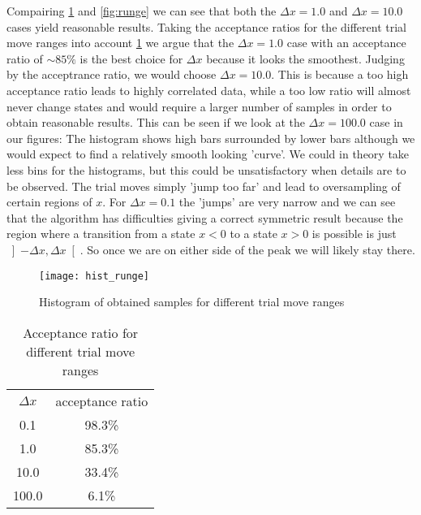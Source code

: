 \documentclass[a4paper,11pt,bibtotoc]{scrartcl}
\begin{document}
Compairing \cref{fig:hist_runge} and \cref{fig:runge} we can see that both
the $\Delta x = 1.0$ and $\Delta x = 10.0$ cases yield reasonable results.
Taking the acceptance ratios for the different trial move ranges into account
\cref{tab:acceptance} we argue that the $\Delta x = 1.0$ case with an acceptance
ratio of $\sim 85\%$ is the best choice for $\Delta x$ because it looks the smoothest.
Judging by the acceptrance ratio, we would choose $\Delta x = 10.0$.
This is because a too high acceptance ratio leads to highly correlated data,
while a too low ratio will almost never change states and would require
a larger number of samples in order to obtain reasonable results.
This can be seen if we look at the $\Delta x = 100.0$ case in our figures:
The histogram shows high bars surrounded by lower bars although we would expect
to find a relatively smooth looking 'curve'.
We could in theory take less bins for the histograms, but this could be unsatisfactory
when details are to be observed. The trial moves simply 'jump too far'
and lead to oversampling of certain regions of $x$.
For $\Delta x = 0.1$ the 'jumps' are very narrow and we can see that the algorithm
has difficulties giving a correct symmetric result because the region where a transition
from a state $x<0$ to a state $x>0$ is possible is just $\left]-\Delta x, \Delta x \right[$.
So once we are on either side of the peak we will likely stay there.

\begin{figure}[htb]
  \centering
  \texttt{[image: hist\_runge]}
  \caption{Histogram of obtained samples for different trial move ranges}
  \label{fig:hist_runge}
\end{figure}

\begin{table}
  \centering
  \begin{tabular}{c | c}
    $\Delta x$ & acceptance ratio \\
    0.1 & 98.3\% \\
    1.0 & 85.3\% \\
    10.0 & 33.4\% \\
    100.0 & 6.1\%
  \end{tabular}
 \caption{Acceptance ratio for different trial move ranges}
 \label{tab:acceptance}
\end{table}
\end{document}
